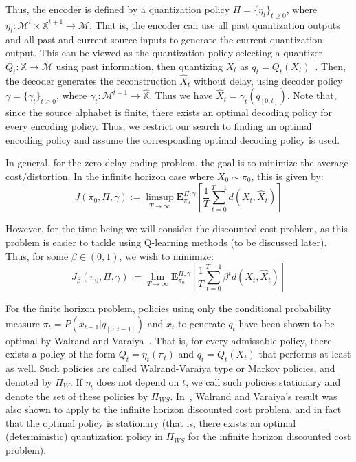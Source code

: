 \documentclass{article}
\begin{document}
Thus, the encoder is defined by a quantization policy \( \Pi = \{\eta_t\}_{t \ge 0} \), where \( \eta_t : \mathcal{M}^t \times \mathbb{X}^{t+1} \to \mathcal{M} \). That is, the encoder can use all past quantization outputs and all past and current source inputs to generate the current quantization output. This can be viewed as the quantization policy selecting a quantizer \( Q_t : \mathbb{X} \to \mathcal{M} \) using past information, then quantizing \( X_t \) as \( q_t = Q_t(X_t) \)~\cite{Linder}. Then, the decoder generates the reconstruction \( \hat{X}_t \) without delay, using decoder policy \( \gamma = \{\gamma_t\}_{t \ge 0} \), where \( \gamma_t : \mathcal{M}^{t+1} \to \hat{\mathbb{X}} \). Thus we have \( \hat{X}_t = \gamma_t(q_{[0,t]}) \). Note that, since the source alphabet is finite, there exists an optimal decoding policy for every encoding policy. Thus, we restrict our search to finding an optimal encoding policy and assume the corresponding optimal decoding policy is used. %

In general, for the zero-delay coding problem, the goal is to minimize the average cost/distortion. In the infinite horizon case where \( X_0 \sim \pi_0 \), this is given by: %
\[ J(\pi_0, \Pi, \gamma) := \limsup_{T\to\infty}\mathbf{E}_{\pi_0}^{\Pi, \gamma}\left[\frac{1}{T}\sum_{t=0}^{T-1}d(X_t,\hat{X}_t)\right] \]

However, for the time being we will consider the discounted cost problem, as this problem is easier to tackle using Q-learning methods (to be discussed later). Thus, for some \( \beta \in (0,1) \), we wish to minimize:
\[ J_{\beta}(\pi_0, \Pi, \gamma) := \lim_{T\to\infty}\mathbf{E}_{\pi_0}^{\Pi, \gamma}\left[\frac{1}{T}\sum_{t=0}^{T-1}\beta^t d(X_t,\hat{X}_t)\right] \]

For the finite horizon problem, policies using only the conditional probability measure \( \pi_t = P(x_{t+1}|q_{[0,t-1]}) \) and \( x_t \) to generate \( q_t \) have been shown to be optimal by Walrand and Varaiya~\cite{Walrand}. That is, for every admissable policy, there exists a policy of the form \( Q_t = \eta_t(\pi_t) \) and \( q_t = Q_t(X_t) \) that performs at least as well. Such policies are called Walrand-Varaiya type or Markov policies, and denoted by \( \Pi_{W} \). If \( \eta_t \) does not depend on \( t \), we call such policies stationary and denote the set of these policies by \( \Pi_{WS} \). In~\cite{Wood}, Walrand and Varaiya's result was also shown to apply to the infinite horizon discounted cost problem, and in fact that the optimal policy is stationary (that is, there exists an optimal (deterministic) quantization policy in \( \Pi_{WS} \) for the infinite horizon discounted cost problem).
\end{document}
